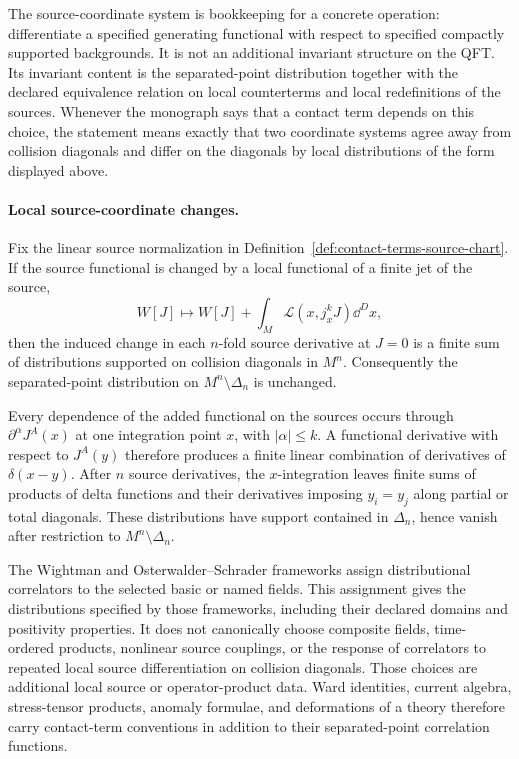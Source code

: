The source-coordinate system is bookkeeping for a concrete operation:
differentiate a specified generating functional with respect to specified
compactly supported backgrounds.  It is not an additional invariant structure
on the QFT.  Its invariant content is the separated-point distribution
together with the declared equivalence relation on local counterterms and
local redefinitions of the sources.  Whenever the monograph says that a
contact term depends on this choice, the statement means exactly that two
coordinate systems agree away from collision diagonals and differ on the
diagonals by local distributions of the form displayed above.

\paragraph{Local source-coordinate changes.}
Fix the linear source normalization in
Definition~\ref{def:contact-terms-source-chart}.  If the source functional is
changed by a local functional of a finite jet of the source,
\[
  W[J]\longmapsto
  W[J]+\int_M\mathcal L(x,j_x^kJ)\dd^Dx,
\]
then the induced change in each \(n\)-fold source derivative at \(J=0\) is a
finite sum of distributions supported on collision diagonals in \(M^n\).
Consequently the separated-point distribution on \(M^n\setminus\Delta_n\) is
unchanged.

Every dependence of the added functional on the sources occurs through
\(\partial^\alpha J^A(x)\) at one integration point \(x\), with
\(|\alpha|\le k\).  A functional derivative with respect to \(J^A(y)\)
therefore produces a finite linear combination of derivatives of
\(\delta(x-y)\).  After \(n\) source derivatives, the \(x\)-integration leaves
finite sums of products of delta functions and their derivatives imposing
\(y_i=y_j\) along partial or total diagonals.  These distributions have
support contained in \(\Delta_n\), hence vanish after restriction to
\(M^n\setminus\Delta_n\).

The Wightman and Osterwalder--Schrader frameworks assign distributional
correlators to the selected basic or named fields.  This assignment gives
the distributions specified by those frameworks, including their declared
domains and positivity properties.  It does not canonically choose composite
fields, time-ordered products, nonlinear source couplings, or the response of
correlators to repeated local source differentiation on collision diagonals.
Those choices are additional local source or operator-product data.  Ward
identities, current algebra, stress-tensor products, anomaly formulae, and
deformations of a theory therefore carry contact-term conventions in addition
to their separated-point correlation functions.

